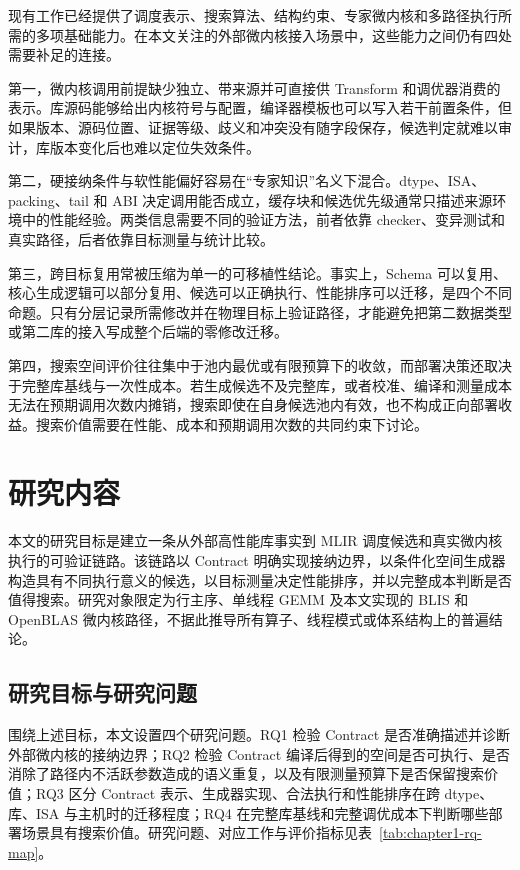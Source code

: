 现有工作已经提供了调度表示、搜索算法、结构约束、专家微内核和多路径执行所需的多项基础能力。在本文关注的外部微内核接入场景中，这些能力之间仍有四处需要补足的连接。

第一，微内核调用前提缺少独立、带来源并可直接供 Transform 和调优器消费的表示。库源码能够给出内核符号与配置，编译器模板也可以写入若干前置条件，但如果版本、源码位置、证据等级、歧义和冲突没有随字段保存，候选判定就难以审计，库版本变化后也难以定位失效条件。

第二，硬接纳条件与软性能偏好容易在“专家知识”名义下混合。dtype、ISA、packing、tail 和 ABI 决定调用能否成立，缓存块和候选优先级通常只描述来源环境中的性能经验。两类信息需要不同的验证方法，前者依靠 checker、变异测试和真实路径，后者依靠目标测量与统计比较。

第三，跨目标复用常被压缩为单一的可移植性结论。事实上，Schema 可以复用、核心生成逻辑可以部分复用、候选可以正确执行、性能排序可以迁移，是四个不同命题。只有分层记录所需修改并在物理目标上验证路径，才能避免把第二数据类型或第二库的接入写成整个后端的零修改迁移。

第四，搜索空间评价往往集中于池内最优或有限预算下的收敛，而部署决策还取决于完整库基线与一次性成本。若生成候选不及完整库，或者校准、编译和测量成本无法在预期调用次数内摊销，搜索即使在自身候选池内有效，也不构成正向部署收益。搜索价值需要在性能、成本和预期调用次数的共同约束下讨论。

\section{研究内容}

本文的研究目标是建立一条从外部高性能库事实到 MLIR 调度候选和真实微内核执行的可验证链路。该链路以 Contract 明确实现接纳边界，以条件化空间生成器构造具有不同执行意义的候选，以目标测量决定性能排序，并以完整成本判断是否值得搜索。研究对象限定为行主序、单线程 GEMM 及本文实现的 BLIS 和 OpenBLAS 微内核路径，不据此推导所有算子、线程模式或体系结构上的普遍结论。

\subsection{研究目标与研究问题}

围绕上述目标，本文设置四个研究问题。RQ1 检验 Contract 是否准确描述并诊断外部微内核的接纳边界；RQ2 检验 Contract 编译后得到的空间是否可执行、是否消除了路径内不活跃参数造成的语义重复，以及有限测量预算下是否保留搜索价值；RQ3 区分 Contract 表示、生成器实现、合法执行和性能排序在跨 dtype、库、ISA 与主机时的迁移程度；RQ4 在完整库基线和完整调优成本下判断哪些部署场景具有搜索价值。研究问题、对应工作与评价指标见表~\ref{tab:chapter1-rq-map}。

